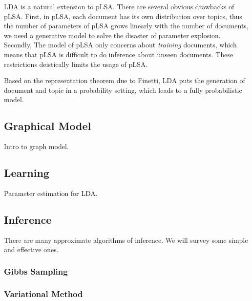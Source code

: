 LDA\cite{blei2003latent} is a natural extension to pLSA. There are several obvious drawbacks of pLSA. First, in pLSA, each document has its own distribution over topics, thus the number of parameters of pLSA grows linearly with the number of documents, we need a generative model to solve the disaster of parameter explosion. Secondly, The model of pLSA only concerns about \emph{training} documents, which means that pLSA is difficult to do inference about unseen documents. These restrictions deistically limits the usage of pLSA. 

Based on the representation theorem due to Finetti\cite{de1970theory}, LDA puts the generation of document and topic in a probability setting, which leads to a fully probabilistic model. 

\subsection{Graphical Model}
Intro to graph model. \cite{jordan1998introduction}

\subsection{Learning}
Parameter estimation for LDA. \cite{heinrich2005parameter}

\subsection{Inference}
There are many approximate algorithms of inference. We will survey some simple and effective ones.

\subsubsection{Gibbs Sampling}
\cite{casella1992explaining}

\subsubsection{Variational Method}